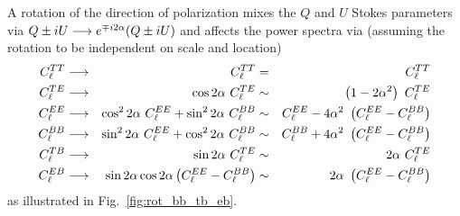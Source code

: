 \documentclass[PICOReport.tex]{subfiles}
\begin{document}
A rotation {\prang} of the direction of polarization mixes the $Q$ and $U$ Stokes parameters via
$Q\pm iU \longrightarrow e^{\mp i 2 \alpha} (Q\pm iU)$
and affects the power spectra via (assuming the rotation to be independent on scale and location)
\begin{subequations}
\begin{align}
C^{TT}_\ell &\longrightarrow & C^{TT}_\ell                                             &= & C^{TT}_\ell \\
C^{TE}_\ell &\longrightarrow & \cos 2\prang\  C^{TE}_\ell                                &\sim & \left(1 - 2\prang^2\right)\ C^{TE}_\ell \\
C^{EE}_\ell &\longrightarrow & \cos^2 2\prang\  C^{EE}_\ell + \sin^2 2\prang\  C^{BB}_\ell &\sim & C^{EE}_\ell - 4\prang^2\ \left(C^{EE}_\ell - C^{BB}_\ell\right) \\
C^{BB}_\ell &\longrightarrow & \sin^2 2\prang\  C^{EE}_\ell + \cos^2 2\prang\  C^{BB}_\ell &\sim & C^{BB}_\ell + 4\prang^2\ \left(C^{EE}_\ell - C^{BB}_\ell\right)\\
C^{TB}_\ell &\longrightarrow & \sin 2\prang\  C^{TE}_\ell                                &\sim & 2\prang\  C^{TE}_\ell \\
C^{EB}_\ell &\longrightarrow & \sin 2\prang \cos 2\prang \left(C^{EE}_\ell -  C^{BB}_\ell\right)  &\sim & 2\prang\ \left(C^{EE}_\ell -  C^{BB}_\ell\right)
\end{align}
\end{subequations}
as illustrated in Fig.~\ref{fig:rot_bb_tb_eb}.
\end{document}
